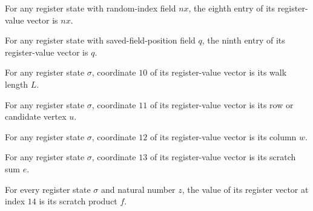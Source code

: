 \begin{lemma}
\label{Complexity.LogProg.UReg.v_8}
\leanok
{}
For any register state with random-index field $nx$, the eighth entry of its
register-value vector is $nx$.
\end{lemma}

\begin{lemma}
\label{Complexity.LogProg.UReg.v_9}
\leanok
{}
For any register state with saved-field-position field $q$, the ninth entry of its
register-value vector is $q$.
\end{lemma}

\begin{lemma}
\label{Complexity.LogProg.UReg.v_10}
\leanok
{}
For any register state $\sigma$, coordinate $10$ of its register-value vector is its
walk length $L$.
\end{lemma}

\begin{lemma}
\label{Complexity.LogProg.UReg.v_11}
\leanok
{}
For any register state $\sigma$, coordinate $11$ of its register-value vector is its row
or candidate vertex $u$.
\end{lemma}

\begin{lemma}
\label{Complexity.LogProg.UReg.v_12}
\leanok
{}
For any register state $\sigma$, coordinate $12$ of its register-value vector is its
column $w$.
\end{lemma}

\begin{lemma}
\label{Complexity.LogProg.UReg.v_13}
\leanok
{}
For any register state $\sigma$, coordinate $13$ of its register-value vector is its
scratch sum $e$.
\end{lemma}

\begin{lemma}
\label{Complexity.LogProg.UReg.v_14}
\leanok
{}
For every register state $\sigma$ and natural number $z$, the value of its register
vector at index $14$ is its scratch product $f$.
\end{lemma}

